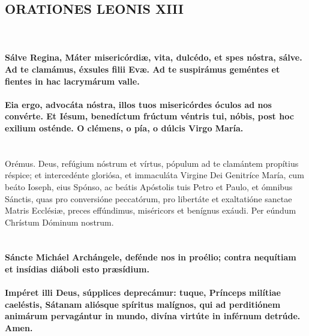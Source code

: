 \documentclass[12pt, a4paper]{article}
\begin{document}
	\newpage
	
	\subsection*{ORATIONES LEONIS XIII}
	
	\\
	\\
	\textbf{Sálve Regina, Máter misericórdiæ,
	vita, dulcédo, et spes nóstra, sálve.
	Ad te clamámus, éxsules filii Evæ.
	Ad te suspirámus geméntes et
	fientes in hac lacrymárum valle.}
	\\\\
	\textbf{Eia ergo, advocáta nóstra, illos tuos
	misericórdes óculos ad nos
	convérte. Et Iésum, benedíctum
	frúctum véntris tui, nóbis, post hoc
	exilium osténde. O clémens, o pía, o dúlcis Virgo
	María.}
	\\\\
	\\
	Orémus. Deus, refúgium nóstrum et vírtus,
	pópulum ad te clamántem propítius
	réspice; et intercedénte gloriósa, et
	immaculáta Virgine Dei Genitríce
	María, cum beáto Ioseph, eius
	Spónso, ac beátis Apóstolis tuis
	Petro et Paulo, et ómnibus Sánctis,
	quas pro conversióne peccatórum,
	pro libertáte et exaltatióne sanctae
	Matris Ecclésiæ, preces effúndimus,
	miséricors et benígnus exáudi. Per
	eúndum Chrístum Dóminum
	nostrum.
	\\\\
	\\
	\textbf{Sáncte Micháel Archángele,
	defénde nos in proélio; contra
	nequítiam et insídias diáboli
	esto præsídium.}
	\\\\
	\textbf{Impéret illi Deus, súpplices
	deprecámur: tuque, Prínceps
	milítiae caeléstis, Sátanam aliósque
	spíritus malígnos, qui ad
	perditiónem animárum pervagántur
	in mundo, divína virtúte in
	inférnum detrúde. Amen.}
	\\\\
	\\
	
\end{document}
